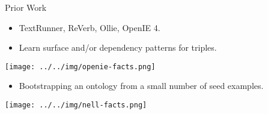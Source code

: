 \def\title{Prior Work}
\begin{frame}{\title}

\begin{itemize}
  \item TextRunner, ReVerb, Ollie, OpenIE 4.
  \item Learn surface and/or dependency patterns for triples.
\end{itemize}
\begin{center}
  \texttt{[image: ../../img/openie-facts.png]} \\
\end{center}
\pause

\begin{itemize}
  \item Bootstrapping an ontology from a small number of seed examples.
\end{itemize}
\begin{center}
  \texttt{[image: ../../img/nell-facts.png]} \\
\end{center}
\pause

\end{frame}


